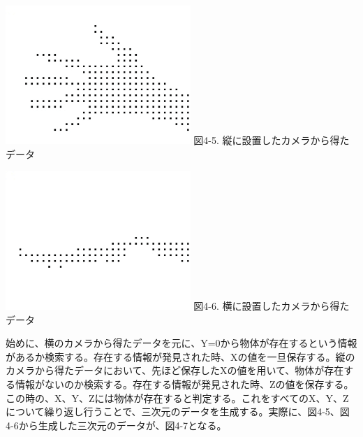  \vspace{5mm}
\begin{minipage}{0.5\hsize}
  \begin{center}
   \includegraphics[width=70mm]{Simulator_data_h.eps}
   図4-5. 縦に設置したカメラから得たデータ
  \end{center}
  \label{fig:one}
 \end{minipage}
 \begin{minipage}{0.5\hsize}
  \begin{center}
   \includegraphics[width=70mm]{Simulator_data_v.eps}
   図4-6. 横に設置したカメラから得たデータ
  \end{center}
  \label{fig:two}
 \end{minipage}
 
 始めに、横のカメラから得たデータを元に、Y=0から物体が存在するという情報があるか検索する。存在する情報が発見された時、Xの値を一旦保存する。縦のカメラから得たデータにおいて、先ほど保存したXの値を用いて、物体が存在する情報がないのか検索する。存在する情報が発見された時、Zの値を保存する。この時の、X、Y、Zには物体が存在すると判定する。これをすべてのX、Y、Zについて繰り返し行うことで、三次元のデータを生成する。実際に、図4-5、図4-6から生成した三次元のデータが、図4-7となる。
 
